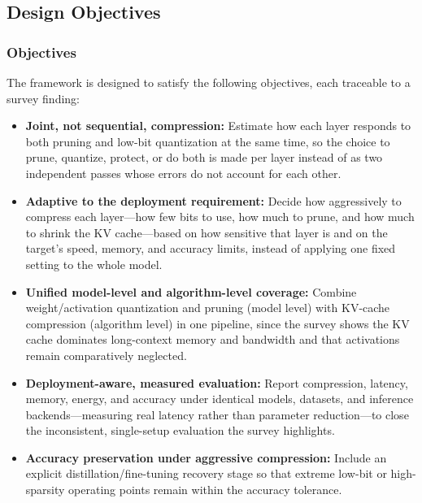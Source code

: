 \subsection{Design Objectives}

\subsubsection{Objectives}

The framework is designed to satisfy the following objectives, each traceable to a survey finding:

\begin{itemize}

  \item \textbf{Joint, not sequential, compression:} Estimate how each layer responds to both pruning and low-bit quantization at the same time, so the choice to prune, quantize, protect, or do both is made per layer instead of as two independent passes whose errors do not account for each other.

  \item \textbf{Adaptive to the deployment requirement:} Decide how aggressively to compress each layer---how few bits to use, how much to prune, and how much to shrink the KV cache---based on how sensitive that layer is and on the target's speed, memory, and accuracy limits, instead of applying one fixed setting to the whole model.

  \item \textbf{Unified model-level and algorithm-level coverage:} Combine weight/activation quantization and pruning (model level) with KV-cache compression (algorithm level) in one pipeline, since the survey shows the KV cache dominates long-context memory and bandwidth and that activations remain comparatively neglected.

  \item \textbf{Deployment-aware, measured evaluation:} Report compression, latency, memory, energy, and accuracy under identical models, datasets, and inference backends---measuring real latency rather than parameter reduction---to close the inconsistent, single-setup evaluation the survey highlights.

  \item \textbf{Accuracy preservation under aggressive compression:} Include an explicit distillation/fine-tuning recovery stage so that extreme low-bit or high-sparsity operating points remain within the accuracy tolerance.

\end{itemize}

